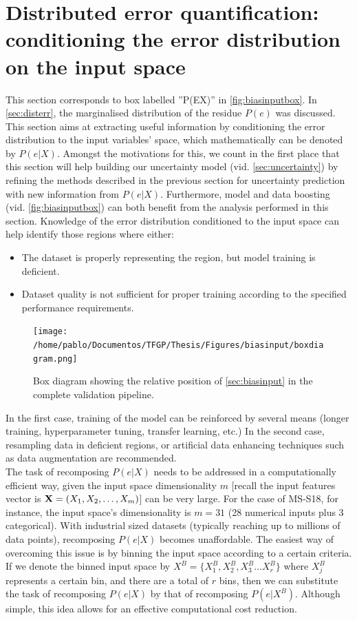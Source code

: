 \section{Distributed error quantification: conditioning the error distribution on the input space}\label{sec:biasinput}
This section corresponds to box labelled ''P(E\textbar{}X)'' in \autoref{fig:biasinputbox}. In \autoref{sec:disterr}, the marginalised distribution of the residue $P(e)$ was discussed. This section aims at extracting useful information by conditioning the error distribution to the input variables' space, which mathematically can be denoted by $P(e|X)$. Amongst the motivations for this, we count in the first place that this section will help building our uncertainty model (vid. \autoref{sec:uncertainty}) by refining the methods described in the previous section for uncertainty prediction with new information from $P(e|X)$. Furthermore, model and data boosting (vid. \autoref{fig:biasinputbox}) can both benefit from the analysis performed in this section. Knowledge of the error distribution conditioned to the input space can help identify those regions where either:
\begin{itemize}
	\item The dataset is properly representing the region, but model training is deficient.
	\item Dataset quality is not sufficient for proper training according to the specified performance requirements.
\end{itemize}
\begin{figure}[!htb]
	\centering
	\texttt{[image: /home/pablo/Documentos/TFGP/Thesis/Figures/biasinput/boxdiagram.png]}
	\caption{Box diagram showing the relative position of \autoref{sec:biasinput} in the complete validation pipeline.}
	\label{fig:biasinputbox} 
\end{figure}
\indent In the first case, training of the model can be reinforced by several means (longer training, hyperparameter tuning, transfer learning, etc.) In the second case, resampling data in deficient regions, or artificial data enhancing techniques such as data augmentation\cite{taylor2018improving} are recommended.\\
%
\indent The task of recomposing $P(e|X)$ needs to be addressed in a computationally efficient way, given the input space dimensionality $m$ [recall the input features vector is ${\bf X}=(X_1,X_2,\dots,X_m)$] can be very large. For the case of MS-S18, for instance, the input space's dimensionality is $m=31$ (28 numerical inputs plus 3 categorical). With industrial sized datasets (typically reaching up to millions of data points), recomposing $P(e|X)$ becomes unaffordable. The easiest way of overcoming this issue is by binning the input space according to a certain criteria. If we denote the binned input space by $X^B=\{X^B_1,X^B_2,X^B_3\ldots X^B_r\}$ where $X^B_j$ represents a certain bin, and there are a total of $r$ bins, then we can substitute the task of recomposing $P(e|X)$ by that of recomposing $P(e|X^B)$. Although simple, this idea allows for an effective computational cost reduction.\\
%
